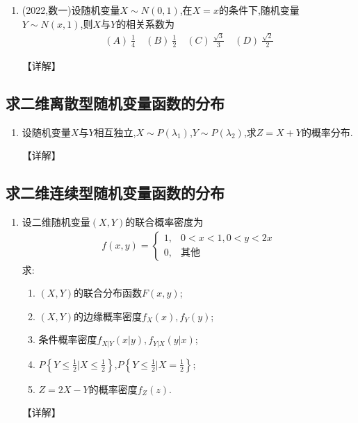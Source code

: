 \documentclass[12pt, a4paper, oneside, UTF8]{ctexbook}
\begin{document}
\begin{enumerate}[label=\arabic*.,start=4]
    \item (2022,数一)设随机变量$X\sim N(0,1)$,在$X=x$的条件下,随机变量$Y\sim N(x,1)$,则$X$与$Y$的相关系数为
    \begin{align*}
        (A)\ \frac{1}{4} \quad (B)\ \frac{1}{2} \quad (C)\ \frac{\sqrt{3}}{3} \quad (D)\ \frac{\sqrt{2}}{2}
    \end{align*}
    
    \begin{solution}
    【详解】
    \end{solution}
\end{enumerate}

\subsection{求二维离散型随机变量函数的分布}

\begin{enumerate}[label=\arabic*.,start=12]
    \item 设随机变量$X$与$Y$相互独立,$X\sim P(\lambda_1)$,$Y\sim P(\lambda_2)$,求$Z=X+Y$的概率分布.
    
    \begin{solution}
    【详解】
    \end{solution}
\end{enumerate}

\subsection{求二维连续型随机变量函数的分布}

\begin{enumerate}[label=\arabic*.,start=13]
    \item 设二维随机变量$(X,Y)$的联合概率密度为
    \begin{align*}
        f(x,y)=\begin{cases}
            1, & 0<x<1,0<y<2x \\
            0, & \text{其他}
        \end{cases}
    \end{align*}
    求:
    \begin{enumerate}
        \item $(X,Y)$的联合分布函数$F(x,y)$;
        \item $(X,Y)$的边缘概率密度$f_X(x),f_Y(y)$;
        \item 条件概率密度$f_{X|Y}(x|y),f_{Y|X}(y|x)$;
        \item $P\left\{Y\leq \frac{1}{2}|X\leq \frac{1}{2}\right\}$,$P\left\{Y\leq \frac{1}{2}|X=\frac{1}{2}\right\}$;
        \item $Z=2X-Y$的概率密度$f_Z(z)$.
    \end{enumerate}
    
    \begin{solution}
    【详解】
    \end{solution}
\end{enumerate}
\end{document}
